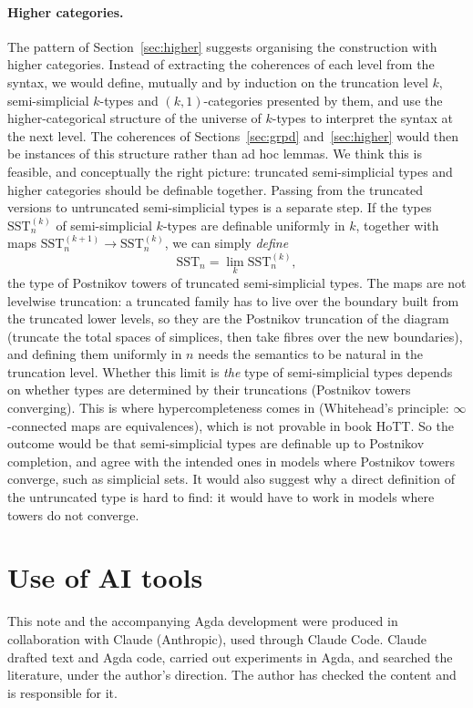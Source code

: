 \documentclass[11pt]{article}
\begin{document}
\paragraph{Higher categories.}
The pattern of Section~\ref{sec:higher} suggests organising the
construction with higher categories. Instead of extracting the coherences of
each level from the syntax, we would define, mutually and by induction on the
truncation level $k$, semi-simplicial $k$-types and $(k,1)$-categories
presented by them, and use the higher-categorical structure of the universe
of $k$-types to interpret the syntax at the next level. The coherences of
Sections~\ref{sec:grpd} and~\ref{sec:higher} would then be instances of this
structure rather than ad hoc lemmas. We think this is feasible, and
conceptually the right picture: truncated semi-simplicial types and higher
categories should be definable together. Passing from the truncated
versions to untruncated semi-simplicial types is a separate step. If the
types $\mathrm{SST}^{(k)}_n$ of semi-simplicial $k$-types are definable
uniformly in $k$, together with maps
$\mathrm{SST}^{(k+1)}_n \to \mathrm{SST}^{(k)}_n$, we can simply
\emph{define}
\[
\mathrm{SST}_n = \lim_k \mathrm{SST}^{(k)}_n,
\]
the type of Postnikov towers of truncated semi-simplicial types. The maps
are not levelwise truncation: a truncated family has to live over the
boundary built from the truncated lower levels, so they are the Postnikov
truncation of the diagram (truncate the total spaces of simplices, then take
fibres over the new boundaries), and defining them uniformly in $n$ needs the
semantics to be natural in the truncation level. Whether this limit is
\emph{the} type of semi-simplicial types depends on whether types are
determined by their truncations (Postnikov towers converging). This is where
hypercompleteness comes in (Whitehead's principle: $\infty$-connected maps
are equivalences), which is not provable in book HoTT. So the outcome would be
that semi-simplicial types are definable up to Postnikov completion, and
agree with the intended ones in models where Postnikov towers converge, such
as simplicial sets. It would also suggest why a direct definition of the
untruncated type is hard to find: it would have to work in models where
towers do not converge.

\section*{Use of AI tools}
This note and the accompanying Agda development were produced in
collaboration with Claude (Anthropic), used through Claude Code. Claude
drafted text and Agda code, carried out experiments in Agda, and searched the
literature, under the author's direction. The author has checked the content
and is responsible for it.
\end{document}
